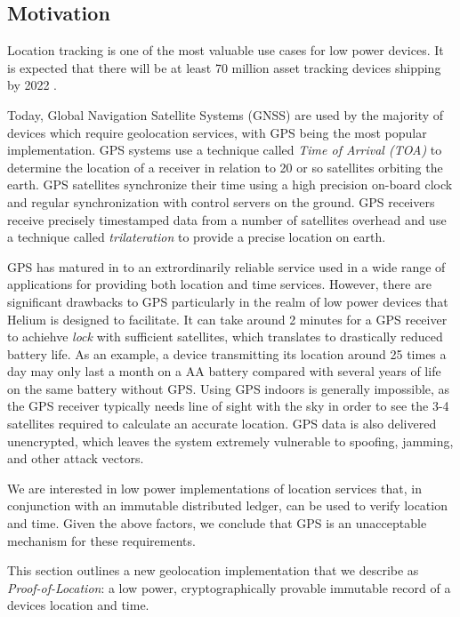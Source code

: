 \documentclass[10pt, nonatbib, nocopyrightspace, reprint]{sigplanconf}
\begin{document}
\subsection{Motivation}

Location tracking is one of the most valuable use cases for low power devices. It is expected that there will be at least 70 million asset tracking devices shipping by 2022 \cite{mobile-experts}.

Today, Global Navigation Satellite Systems (GNSS) are used by the majority of devices which require geolocation services, with GPS being the most popular implementation. GPS systems use a technique called \emph{Time of Arrival (TOA)} to determine the location of a receiver in relation to 20 or so satellites orbiting the earth. GPS satellites synchronize their time using a high precision on-board clock and regular synchronization with control servers on the ground. GPS receivers receive precisely timestamped data from a number of satellites overhead and use a technique called \emph{trilateration} to provide a precise location on earth.

GPS has matured in to an extrordinarily reliable service used in a wide range of applications for providing both location and time services. However, there are significant drawbacks to GPS particularly in the realm of low power devices that Helium is designed to facilitate. It can take around 2 minutes for a GPS receiver to achiehve \emph{lock} with sufficient satellites, which translates to drastically reduced battery life. As an example, a device transmitting its location around 25 times a day may only last a month on a AA battery compared with several years of life on the same battery without GPS. Using GPS indoors is generally impossible, as the GPS receiver typically needs line of sight with the sky in order to see the 3-4 satellites required to calculate an accurate location. GPS data is also delivered unencrypted, which leaves the system extremely vulnerable to spoofing, jamming, and other attack vectors.

We are interested in low power implementations of location services that, in conjunction with an immutable distributed ledger, can be used to verify location and time. Given the above factors, we conclude that GPS is an unacceptable mechanism for these requirements.

This section outlines a new geolocation implementation that we describe as \emph{Proof-of-Location}: a low power, cryptographically provable immutable record of a devices location and time.
\end{document}
